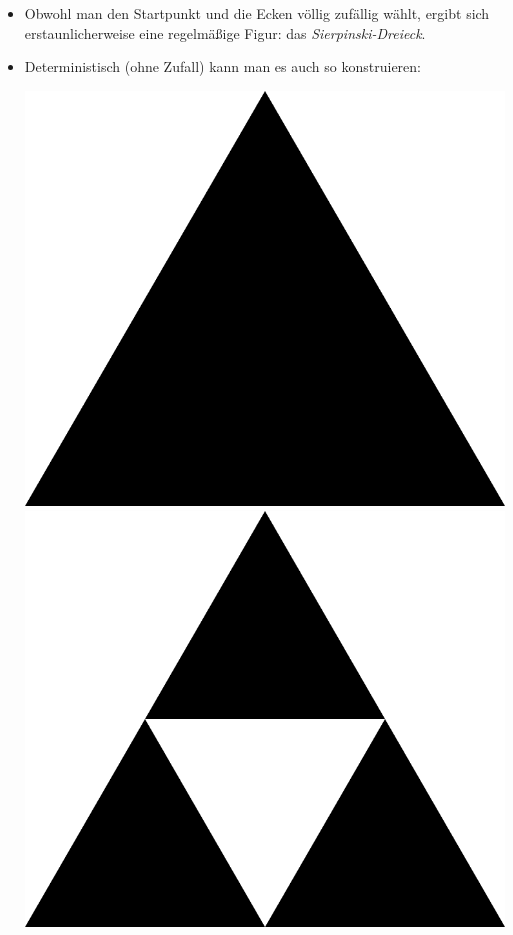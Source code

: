 \documentclass[a4paper,ngerman]{scrartcl}
\begin{document}
\begin{minipage}{0.8\textwidth}

\begin{itemize}
  \item Obwohl man den Startpunkt und die Ecken völlig zufällig wählt, ergibt
  sich erstaunlicherweise eine regelmäßige Figur: das \emph{Sierpinski-Dreieck}.
  \item Deterministisch (ohne Zufall) kann man es auch so konstruieren:

  \begin{center}
    \includegraphics[scale=0.1]{sierpinski-1}\hfill
    \includegraphics[scale=0.1]{sierpinski-2}\hfill

\end{center}
\end{itemize}
\end{minipage}
\end{document}
